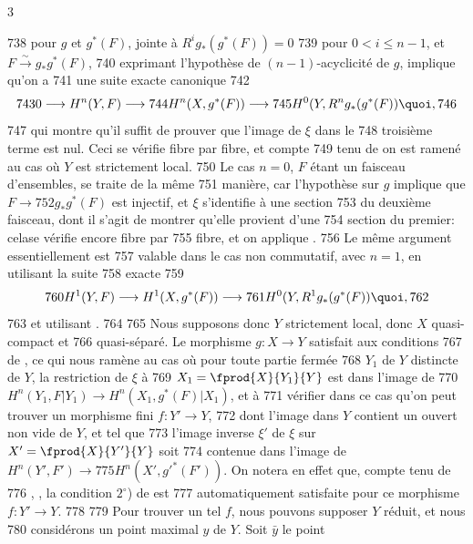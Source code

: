 3	\documentclass[10pt]{../fichiers-configuration-latex/smfart}
\begin{document}
   738	pour $g$ et $g^{\ast}(F)$, jointe à $R^{i}g_{\ast}(g^{\ast}(F))=0$
   739	pour $0<i\leq n-1$, et $F\xrightarrow{\sim}g_{\ast}g^{\ast}(F)$,
   740	exprimant l'hypothèse de $(n-1)$-acyclicité de $g$, implique qu'on a
   741	une suite exacte canonique
   742	$$
   743	0\longrightarrow H^{n}(Y,F)\longrightarrow
   744	H^{n}(X,g^{\ast}(F))\longrightarrow
   745	H^{0}(Y,R^{n}g_{\ast}(g^{\ast}(F)){\quoi},
   746	$$
   747	qui montre qu'il suffit de prouver que l'image de $\xi$ dans le
   748	troisième terme est nul. Ceci se vérifie fibre par fibre, et compte
   749	tenu de  on est ramené au cas où $Y$ est strictement local.
   750	Le cas $n=0$, $F$ étant un faisceau d'ensembles, se traite de la même
   751	manière, car l'hypothèse sur $g$ implique que $F\rightarrow
   752	g_{\ast}g^{\ast}(F)$ est injectif, et $\xi$ s'identifie à une section
   753	du deuxième faisceau, dont il s'agit de montrer qu'elle provient d'une
   754	section du premier: cela\pageoriginale se vérifie encore fibre par
   755	fibre, et on applique .
   756	Le même argument essentiellement est
   757	valable dans le cas non commutatif, avec $n=1$, en utilisant la suite
   758	exacte 
   759	$$
   760	H^{1}(Y,F)\longrightarrow H^{1}(X,g^{\ast}(F))\longrightarrow
   761	H^{0}(Y,R^{1}g_{\ast}(g^{\ast}(F)){\quoi},
   762	$$
   763	et utilisant .
   764	
   765	Nous supposons donc $Y$ strictement local, donc $X$ quasi-compact et
   766	quasi-séparé. Le morphisme $g:X\rightarrow Y$ satisfait aux conditions
   767	de , ce qui nous ramène au cas où pour toute partie fermée
   768	$Y_{1}$ de $Y$ distincte de $Y$, la restriction de $\xi$ à
   769	$X_{1}=\fprod{X}{Y_1}{Y}$ est dans l'image de
   770	$H^{n}(Y_1,F|Y_1)\rightarrow H^{n}(X_1,g^{\ast}(F)|X_1)$, et à
   771	vérifier dans ce cas qu'on peut trouver un morphisme fini $f:Y' \rightarrow Y$,
   772	dont l'image dans $Y$ contient un ouvert non vide de $Y$, et tel que
   773	l'image inverse $\xi'$ de $\xi$ sur $X'=\fprod{X}{Y'}{Y}$ soit
   774	contenue dans l'image de $H^{n}(Y',F')\rightarrow
   775	H^{n}(X',{g'}^{\ast}(F'))$. On notera en effet que, compte tenu de
   776	, , la condition $2^{\circ}$) de \loccit est
   777	automatiquement satisfaite pour ce morphisme $f:Y'\rightarrow Y$.
   778	
   779	Pour trouver un tel $f$, nous pouvons supposer $Y$ réduit, et nous
   780	considérons un point maximal $y$ de $Y$. Soit $\bar{y}$ le point
\end{document}
